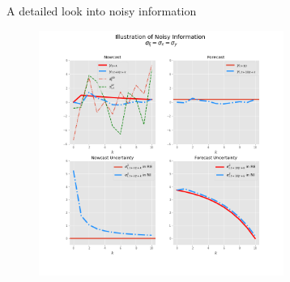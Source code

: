 \documentclass{beamer}
\begin{document}




\begin{frame}{A detailed look into noisy information}


\begin{figure}
	\includegraphics[height=8cm,width=8cm]{figuresDraft/ni_illustration} 
\end{figure}

\end{frame}
\end{document}
